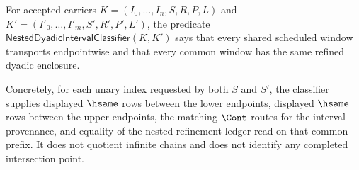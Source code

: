 \begin{definition}
\label{def:nesteddyadicinterval-classifier}
For accepted carriers $K=(I_0,\ldots,I_n,S,R,P,L)$ and $K'=(I'_0,\ldots,I'_m,S',R',P',L')$, the predicate $\mathsf{NestedDyadicIntervalClassifier}(K,K')$ says that every shared scheduled window transports endpointwise and that every common window has the same refined dyadic enclosure.

Concretely, for each unary index requested by both $S$ and $S'$, the classifier supplies displayed $\hsame$ rows between the lower endpoints, displayed $\hsame$ rows between the upper endpoints, the matching $\Cont$ routes for the interval provenance, and equality of the nested-refinement ledger read on that common prefix. It does not quotient infinite chains and does not identify any completed intersection point.
\end{definition}

